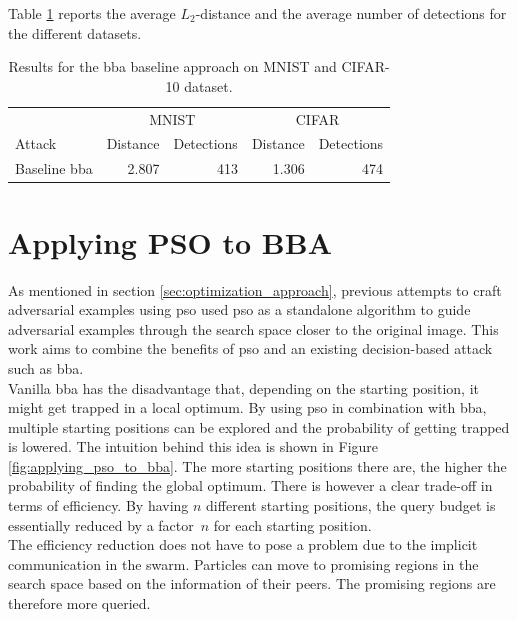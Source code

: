 Table \ref{tbl:baseline} reports the average $L_2$-distance and the average number of detections for the different datasets. 

\begin{table}
	\centering
	\caption[Baseline results]{Results for the \gls{bba} baseline approach on MNIST and CIFAR-10 dataset.}
	\label{tbl:baseline}
	\begin{tabular}{lrrrr}\toprule
			& \multicolumn{2}{c}{MNIST} &\multicolumn{2}{c}{CIFAR} \\ \cmidrule(r){2-3} \cmidrule(r){4-5}
	Attack				&Distance	&Detections	&Distance	&Detections \\ \midrule
	Baseline \gls{bba}	&2.807		&413		&1.306			&474 \\ \bottomrule
	
	\end{tabular}
\end{table}

\section{Applying PSO to BBA} \label{sec:combining_pso_bba}
As mentioned in section \ref{sec:optimization_approach}, previous attempts to craft adversarial examples using \gls{pso} used \gls{pso} as a standalone algorithm to guide adversarial examples through the search space closer to the original image. This work aims to combine the benefits of \gls{pso} and an existing decision-based attack such as \gls{bba}.\\

Vanilla \gls{bba} has the disadvantage that, depending on the starting position, it might get trapped in a local optimum. By using \gls{pso} in combination with \gls{bba}, multiple starting positions can be explored and the probability of getting trapped is lowered. The intuition behind this idea is shown in Figure \ref{fig:applying_pso_to_bba}. The more starting positions there are, the higher the probability of finding the global optimum. There is however a clear trade-off in terms of efficiency. By having $n$ different starting positions, the query budget is essentially reduced by a factor~$n$ for each starting position.\\

The efficiency reduction does not have to pose a problem due to the implicit communication in the swarm. Particles can move to promising regions in the search space based on the information of their peers. The promising regions are therefore more queried.\\ 

